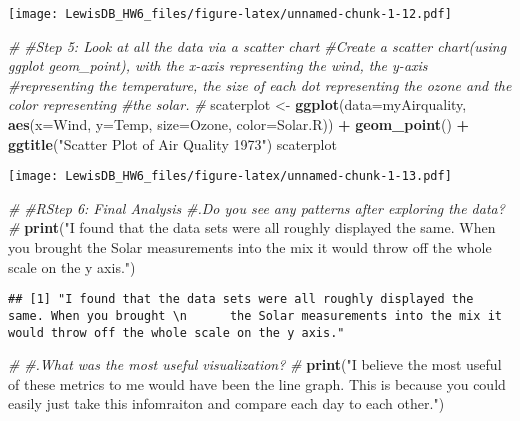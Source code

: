 \documentclass[]{article}
\newenvironment{Shaded}{\begin{snugshade}}{\end{snugshade}}
\newcommand{\KeywordTok}[1]{\textcolor[rgb]{0.13,0.29,0.53}{\textbf{#1}}}
\newcommand{\DataTypeTok}[1]{\textcolor[rgb]{0.13,0.29,0.53}{#1}}
\newcommand{\StringTok}[1]{\textcolor[rgb]{0.31,0.60,0.02}{#1}}
\newcommand{\CommentTok}[1]{\textcolor[rgb]{0.56,0.35,0.01}{\textit{#1}}}
\newcommand{\OperatorTok}[1]{\textcolor[rgb]{0.81,0.36,0.00}{\textbf{#1}}}
\newcommand{\NormalTok}[1]{#1}
\begin{document}
\texttt{[image: LewisDB\_HW6\_files/figure-latex/unnamed-chunk-1-12.pdf]}

\begin{Shaded}
\begin{Highlighting}[]
\CommentTok{#}
\CommentTok{#Step 5: Look at all the data via a scatter chart}
\CommentTok{#Create a scatter chart(using ggplot geom_point), with the x-axis representing the wind, the y-axis }
\CommentTok{#representing the temperature, the size of each dot representing the ozone and the color representing }
\CommentTok{#the solar.}
\CommentTok{#}
\NormalTok{scaterplot <-}\StringTok{ }\KeywordTok{ggplot}\NormalTok{(}\DataTypeTok{data=}\NormalTok{myAirquality, }\KeywordTok{aes}\NormalTok{(}\DataTypeTok{x=}\NormalTok{Wind, }\DataTypeTok{y=}\NormalTok{Temp, }\DataTypeTok{size=}\NormalTok{Ozone, }\DataTypeTok{color=}\NormalTok{Solar.R)) }\OperatorTok{+}\StringTok{ }\KeywordTok{geom_point}\NormalTok{() }\OperatorTok{+}\StringTok{ }\KeywordTok{ggtitle}\NormalTok{(}\StringTok{"Scatter Plot of Air Quality 1973"}\NormalTok{)}
\NormalTok{scaterplot}
\end{Highlighting}
\end{Shaded}

\texttt{[image: LewisDB\_HW6\_files/figure-latex/unnamed-chunk-1-13.pdf]}

\begin{Shaded}
\begin{Highlighting}[]
\CommentTok{#}
\CommentTok{#RStep 6: Final Analysis}
\CommentTok{#.Do you see any patterns after exploring the data?}
\CommentTok{#}
\KeywordTok{print}\NormalTok{(}\StringTok{"I found that the data sets were all roughly displayed the same. When you brought }
\StringTok{      the Solar measurements into the mix it would throw off the whole scale on the y axis."}\NormalTok{)}
\end{Highlighting}
\end{Shaded}

\begin{verbatim}
## [1] "I found that the data sets were all roughly displayed the same. When you brought \n      the Solar measurements into the mix it would throw off the whole scale on the y axis."
\end{verbatim}

\begin{Shaded}
\begin{Highlighting}[]
\CommentTok{#}
\CommentTok{#.What was the most useful visualization?}
\CommentTok{#}
\KeywordTok{print}\NormalTok{(}\StringTok{"I believe the most useful of these metrics to me would have been the line graph.}
\StringTok{      This is because you could easily just take this infomraiton and compare each day to each other."}\NormalTok{)}
\end{Highlighting}
\end{Shaded}
\end{document}
